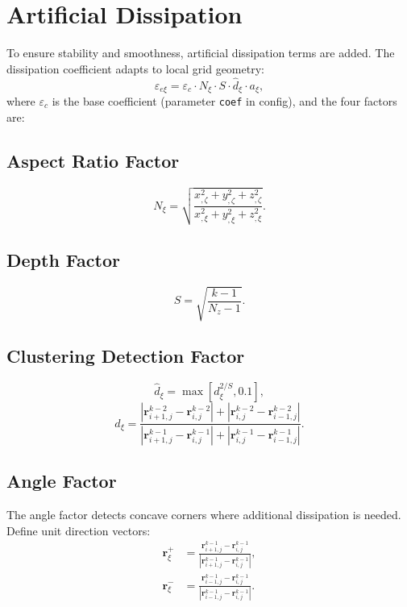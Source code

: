 \documentclass[11pt,a4paper]{report}
\newcommand{\rvec}{\bm{r}}
\begin{document}
\section{Artificial Dissipation}

To ensure stability and smoothness, artificial dissipation terms are added. The dissipation coefficient adapts to local grid geometry:
\begin{equation}
    \varepsilon_{e\xi} = \varepsilon_c \cdot N_\xi \cdot S \cdot \hat{d}_\xi \cdot a_\xi,
\end{equation}
where $\varepsilon_c$ is the base coefficient (parameter \texttt{coef} in config), and the four factors are:

\subsection{Aspect Ratio Factor}
\begin{equation}
    N_\xi = \sqrt{\frac{x_{,\zeta}^2 + y_{,\zeta}^2 + z_{,\zeta}^2}{x_{,\xi}^2 + y_{,\xi}^2 + z_{,\xi}^2}}.
\end{equation}

\subsection{Depth Factor}
\begin{equation}
    S = \sqrt{\frac{k-1}{N_z - 1}}.
\end{equation}

\subsection{Clustering Detection Factor}
\begin{equation}
    \hat{d}_\xi = \max[d_\xi^{2/S}, 0.1],
\end{equation}
\begin{equation}
    d_\xi = \frac{|\rvec_{i+1,j}^{k-2} - \rvec_{i,j}^{k-2}| + |\rvec_{i,j}^{k-2} - \rvec_{i-1,j}^{k-2}|}
                  {|\rvec_{i+1,j}^{k-1} - \rvec_{i,j}^{k-1}| + |\rvec_{i,j}^{k-1} - \rvec_{i-1,j}^{k-1}|}.
\end{equation}

\subsection{Angle Factor}

The angle factor detects concave corners where additional dissipation is needed. Define unit direction vectors:
\begin{equation}
\begin{aligned}
    \rvec_\xi^+ &= \frac{\rvec_{i+1,j}^{k-1} - \rvec_{i,j}^{k-1}}{|\rvec_{i+1,j}^{k-1} - \rvec_{i,j}^{k-1}|}, \\
    \rvec_\xi^- &= \frac{\rvec_{i-1,j}^{k-1} - \rvec_{i,j}^{k-1}}{|\rvec_{i-1,j}^{k-1} - \rvec_{i,j}^{k-1}|}.
\end{aligned}
\end{equation}
\end{document}

